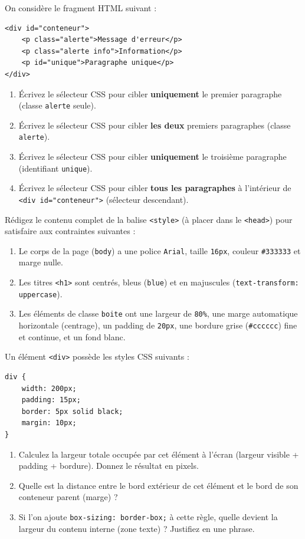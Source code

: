 \documentclass[11pt]{article}
\begin{document}
\begin{exercice}
On considère le fragment HTML suivant :
\begin{verbatim}
<div id="conteneur">
    <p class="alerte">Message d'erreur</p>
    <p class="alerte info">Information</p>
    <p id="unique">Paragraphe unique</p>
</div>
\end{verbatim}
\begin{enumerate}
    \item Écrivez le sélecteur CSS pour cibler \textbf{uniquement} le premier paragraphe (classe \texttt{alerte} seule).
    \item Écrivez le sélecteur CSS pour cibler \textbf{les deux} premiers paragraphes (classe \texttt{alerte}).
    \item Écrivez le sélecteur CSS pour cibler \textbf{uniquement} le troisième paragraphe (identifiant \texttt{unique}).
    \item Écrivez le sélecteur CSS pour cibler \textbf{tous les paragraphes} à l'intérieur de \texttt{<div id="conteneur">} (sélecteur descendant).
\end{enumerate}
\end{exercice}

\begin{exercice}
Rédigez le contenu complet de la balise \texttt{<style>} (à placer dans le \texttt{<head>}) pour satisfaire aux contraintes suivantes :
\begin{enumerate}
    \item Le corps de la page (\texttt{body}) a une police \texttt{Arial}, taille \texttt{16px}, couleur \texttt{\#333333} et marge nulle.
    \item Les titres \texttt{<h1>} sont centrés, bleus (\texttt{blue}) et en majuscules (\texttt{text-transform: uppercase}).
    \item Les éléments de classe \texttt{boite} ont une largeur de \texttt{80\%}, une marge automatique horizontale (centrage), un padding de \texttt{20px}, une bordure grise (\texttt{\#cccccc}) fine et continue, et un fond blanc.
\end{enumerate}
\end{exercice}

\begin{exercice}
Un élément \texttt{<div>} possède les styles CSS suivants :
\begin{verbatim}
div {
    width: 200px;
    padding: 15px;
    border: 5px solid black;
    margin: 10px;
}
\end{verbatim}
\begin{enumerate}
    \item Calculez la largeur totale occupée par cet élément à l'écran (largeur visible + padding + bordure). Donnez le résultat en pixels.
    \item Quelle est la distance entre le bord extérieur de cet élément et le bord de son conteneur parent (marge) ?
    \item Si l'on ajoute \texttt{box-sizing: border-box;} à cette règle, quelle devient la largeur du contenu interne (zone texte) ? Justifiez en une phrase.
\end{enumerate}
\end{exercice}
\end{document}
